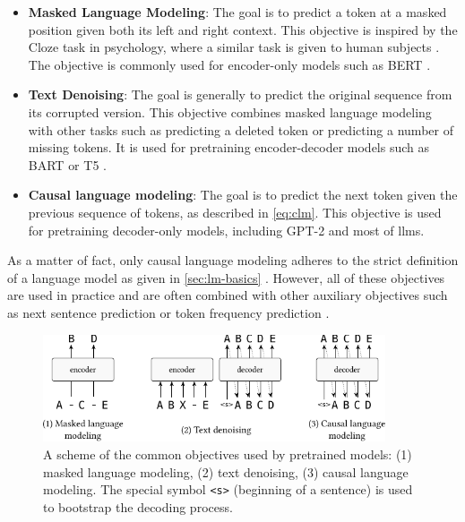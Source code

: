 {\begin{itemize}
    \item \textbf{Masked Language Modeling}: The goal is to predict a token at a masked position given both its left and right context. This objective is inspired by the Cloze task in psychology, where a similar task is given to human subjects \cite{taylor1953cloze}. The objective is commonly used for encoder-only models such as BERT \cite{devlinBERTPretrainingDeep2019}.
    \item \textbf{Text Denoising}: The goal is generally to predict the original sequence from its corrupted version. This objective combines masked language modeling with other tasks such as predicting a deleted token or predicting a number of missing tokens. It is used for pretraining encoder-decoder models such as BART \cite{lewisBARTDenoisingSequencetoSequence2019} or T5 \cite{raffelExploringLimitsTransfer2019}.
    \item \textbf{Causal language modeling}: The goal is to predict the next token given the previous sequence of tokens, as described in \autoref{eq:clm}. This objective is used for pretraining decoder-only models, including GPT-2 \cite{radford2019language} and most of \acp{llm}.
\end{itemize}

As a matter of fact, only causal language modeling adheres to the strict definition of a language model as given in \autoref{sec:lm-basics} \cite{cotterell2024formal}. However, all of these objectives are used in practice and are often combined with other auxiliary objectives such as next sentence prediction or token frequency prediction \cite{aroca2020losses}.

\begin{figure}[t]
    \centering
    \includegraphics[width=0.9\textwidth]{img/objectives.pdf}
    \caption[Pretraining objectives.]{A scheme of the common objectives used by pretrained models: (1) masked language modeling, (2) text denoising, (3)  causal language modeling. The special symbol \texttt{<s>} (beginning of a sentence) is used to bootstrap the decoding process.}\label{fig:objectives}
\end{figure}


}
